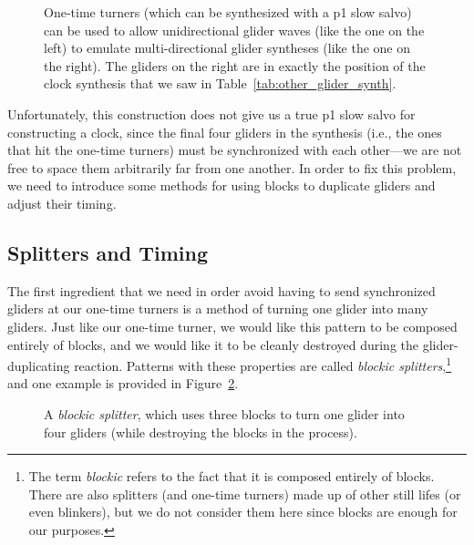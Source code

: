 \begin{figure}[!htb]
	\centering{}
	\caption{One-time turners (which can be synthesized with a p1 slow salvo) can be used to allow unidirectional glider waves (like the one on the left) to emulate multi-directional glider syntheses (like the one on the right). The gliders on the right are in exactly the position of the clock synthesis that we saw in Table~\ref{tab:other_glider_synth}.}\label{fig:unidirection_clock_synthesis}
\end{figure}

Unfortunately, this construction does not give us a true p1 slow salvo for constructing a clock, since the final four gliders in the synthesis (i.e., the ones that hit the one-time turners) must be synchronized with each other---we are not free to space them arbitrarily far from one another. In order to fix this problem, we need to introduce some methods for using blocks to duplicate gliders and adjust their timing.


\subsection{Splitters and Timing}\label{sec:slow_salvo_splitters}

The first ingredient that we need in order avoid having to send synchronized gliders at our one-time turners is a method of turning one glider into many gliders. Just like our one-time turner, we would like this pattern to be composed entirely of blocks, and we would like it to be cleanly destroyed during the glider-duplicating reaction. Patterns with these properties are called \emph{blockic splitters},\footnote{The term \emph{blockic} refers to the fact that it is composed entirely of blocks. There are also splitters (and one-time turners) made up of other still lifes (or even blinkers), but we do not consider them here since blocks are enough for our purposes.} and one example is provided in Figure~\ref{fig:one_time_splitter}.

\begin{figure}[!htb]
	\centering{}
	\caption{A \emph{blockic splitter}, which uses three blocks to turn one glider into four gliders (while destroying the blocks in the process).}\label{fig:one_time_splitter}
\end{figure}

